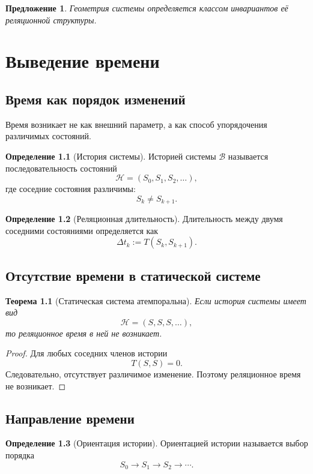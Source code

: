 \documentclass[12pt,a4paper,oneside]{book}
\theoremstyle{definition}
\newtheorem{definition}{Определение}[chapter]
\theoremstyle{plain}
\newtheorem{theorem}{Теорема}[chapter]
\newtheorem{proposition}{Предложение}[chapter]
\theoremstyle{remark}
\newcommand{\SubParts}{\mathcal B}
\newcommand{\State}{S}
\begin{document}
\begin{proposition}
Геометрия системы определяется классом инвариантов её реляционной структуры.
\end{proposition}

\chapter{Выведение времени}

\section{Время как порядок изменений}

Время возникает не как внешний параметр, а как способ упорядочения различимых состояний.

\begin{definition}[История системы]
Историей системы \(\SubParts\) называется последовательность состояний
\[
\mathcal H=(\State_0,\State_1,\State_2,\dots),
\]
где соседние состояния различимы:
\[
\State_k\neq\State_{k+1}.
\]
\end{definition}

\begin{definition}[Реляционная длительность]
Длительность между двумя соседними состояниями определяется как
\[
\Delta t_k:=T(\State_k,\State_{k+1}).
\]
\end{definition}

\section{Отсутствие времени в статической системе}

\begin{theorem}[Статическая система атемпоральна]
Если история системы имеет вид
\[
\mathcal H=(\State,\State,\State,\dots),
\]
то реляционное время в ней не возникает.
\end{theorem}

\begin{proof}
Для любых соседних членов истории
\[
T(\State,\State)=0.
\]
Следовательно, отсутствует различимое изменение. Поэтому реляционное время не возникает.
\end{proof}

\section{Направление времени}

\begin{definition}[Ориентация истории]
Ориентацией истории называется выбор порядка
\[
\State_0\to\State_1\to\State_2\to\cdots.
\]
\end{definition}
\end{document}
